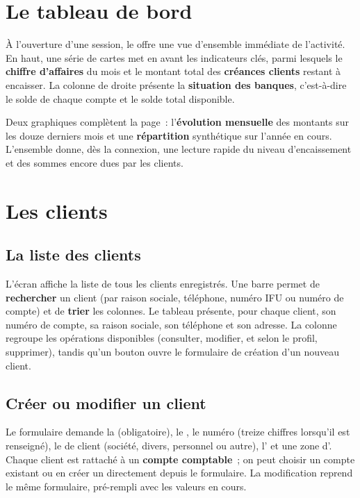 \chapter{Le tableau de bord}

À l'ouverture d'une session, le  offre une vue d'ensemble immédiate de l'activité. En haut, une série de cartes met en avant les indicateurs clés, parmi lesquels le \textbf{chiffre d'affaires} du mois et le montant total des \textbf{créances clients} restant à encaisser. La colonne de droite présente la \textbf{situation des banques}, c'est-à-dire le solde de chaque compte et le solde total disponible.

Deux graphiques complètent la page~: l'\textbf{évolution mensuelle} des montants sur les douze derniers mois et une \textbf{répartition} synthétique sur l'année en cours. L'ensemble donne, dès la connexion, une lecture rapide du niveau d'encaissement et des sommes encore dues par les clients.


\chapter{Les clients}

\section{La liste des clients}
L'écran  affiche la liste de tous les clients enregistrés. Une barre permet de \textbf{rechercher} un client (par raison sociale, téléphone, numéro IFU ou numéro de compte) et de \textbf{trier} les colonnes. Le tableau présente, pour chaque client, son numéro de compte, sa raison sociale, son téléphone et son adresse. La colonne  regroupe les opérations disponibles (consulter, modifier, et selon le profil, supprimer), tandis qu'un bouton ouvre le formulaire de création d'un nouveau client.

\section{Créer ou modifier un client}
Le formulaire demande la  (obligatoire), le , le numéro  (treize chiffres lorsqu'il est renseigné), le  de client (société, divers, personnel ou autre), l' et une zone d'. Chaque client est rattaché à un \textbf{compte comptable}~; on peut choisir un compte existant ou en créer un directement depuis le formulaire. La modification reprend le même formulaire, pré-rempli avec les valeurs en cours.

